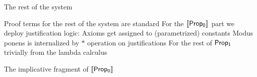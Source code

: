 \documentclass{beamer}
\newcommand{\Turnsi}[2]
	{ {#1}\vdash  {#2}}
\begin{document}
  \begin{frame}{The rest of the system}
    \begin{outline}
    \1[] Proof terms for the rest of the system are standard
    \1[!] For the ${\sf \llbracket Prop_0\rrbracket}$ part we deploy justification logic:
    \2[!] Axioms get assigned to (parametrized) constants
    \2[!!] Modus ponens is internalized by $*$ operation on justifications
    \1[!] For the rest of ${\sf Prop_1}$ trivially from the lambda calculus
  \end{outline}
\end{frame}
\begin{frame}{The  implicative fragment of $\llbracket{\sf  Prop_0} \rrbracket$}

\end{frame}
  
\end{document}
